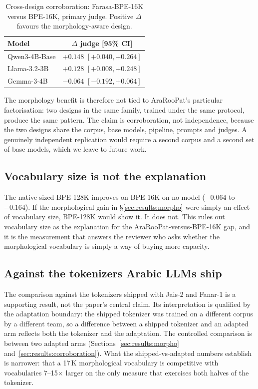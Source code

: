 \documentclass[a4paper,fleqn]{cas-sc}
\begin{document}
\begin{table}[t]
\centering
\caption{Cross-design corroboration: Farasa-BPE-16K versus BPE-16K, primary judge. Positive $\Delta$ favours the morphology-aware design.}
\label{tab:farasa}
\begin{tabular}{@{}lc@{}}
\toprule
Model & $\Delta$ judge [95\% CI] \\
\midrule
Qwen3-4B-Base & $+0.148$ $[+0.040,+0.264]$ \\
Llama-3.2-3B & $+0.128$ $[+0.008,+0.248]$ \\
Gemma-3-4B & $-0.064$ $[-0.192,+0.064]$ \\
\bottomrule
\end{tabular}
\end{table}

The morphology benefit is therefore not tied to AraRooPat's particular factorisation: two designs in the same family, trained under the same protocol, produce the same pattern. The claim is corroboration, not independence, because the two designs share the corpus, base models, pipeline, prompts and judges. A genuinely independent replication would require a second corpus and a second set of base models, which we leave to future work.

\subsection{Vocabulary size is not the explanation}
\label{sec:results:size}

The native-sized BPE-128K improves on BPE-16K on no model ($-0.064$ to $-0.164$). If the morphological gain in \S\ref{sec:results:morpho} were simply an effect of vocabulary size, BPE-128K would show it. It does not. This rules out vocabulary size as the explanation for the AraRooPat-versus-BPE-16K gap, and it is the measurement that answers the reviewer who asks whether the morphological vocabulary is simply a way of buying more capacity.

\subsection{Against the tokenizers Arabic LLMs ship}
\label{sec:results:shipped}

The comparison against the tokenizers shipped with Jais-2 and Fanar-1 is a supporting result, not the paper's central claim. Its interpretation is qualified by the adaptation boundary: the shipped tokenizer was trained on a different corpus by a different team, so a difference between a shipped tokenizer and an adapted arm reflects both the tokenizer and the adaptation. The controlled comparison is between two adapted arms (Sections~\ref{sec:results:morpho} and~\ref{sec:results:corroboration}). What the shipped-vs-adapted numbers establish is narrower: that a 17\,K morphological vocabulary is competitive with vocabularies 7--15$\times$ larger on the only measure that exercises both halves of the tokenizer.
\end{document}
